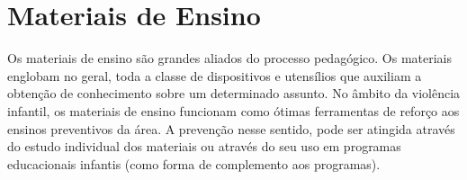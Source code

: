 










\section{Materiais de Ensino}\label{sec:materiais} \vspace{-0.2cm}

Os materiais de ensino são grandes aliados do processo pedagógico. Os materiais englobam no geral, toda a classe de dispositivos e utensílios que auxiliam a obtenção de conhecimento sobre um determinado assunto. No âmbito da violência infantil, os materiais de ensino funcionam como ótimas ferramentas de reforço aos ensinos preventivos da área. A prevenção nesse sentido, pode ser atingida através do estudo individual dos materiais ou através do seu uso em programas educacionais infantis (como forma de complemento aos programas).



